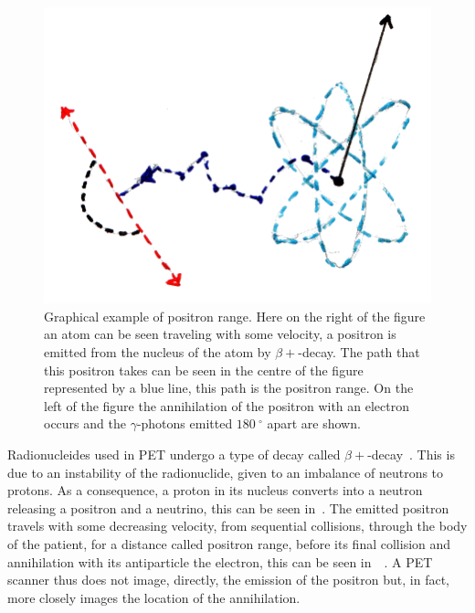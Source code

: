                 \begin{figure}
                    \centering
                    
                    \includegraphics[width=1.0\linewidth]{figures/background_positron_range.png}
                    
                    \captionsetup{singlelinecheck=false, justification=raggedright}
                    \caption{Graphical example of positron range. Here on the right of the figure an atom can be seen traveling with some velocity, a positron is emitted from the nucleus of the atom by $\beta+$-decay. The path that this positron takes can be seen in the centre of the figure represented by a blue line, this path is the positron range. On the left of the figure the annihilation of the positron with an electron occurs and the $\gamma$-photons emitted $\SI{180}{^{\circ}}$ apart are shown.} \label{fig:decay_and_annihilation_positron_range}
                \end{figure}
                
                Radionucleides used in \gls{PET} undergo a type of decay called $\beta+$-decay~. This is due to an instability of the radionuclide, given to an imbalance of neutrons to protons. As a consequence, a proton in its nucleus converts into a neutron releasing a positron and a neutrino, this can be seen in~. The emitted positron travels with some decreasing velocity, from sequential collisions, through the body of the patient, for a distance called positron range, before its final collision and annihilation with its antiparticle the electron, this can be seen in~~. A \gls{PET} scanner thus does not image, directly, the emission of the positron but, in fact, more closely images the location of the annihilation.
                
